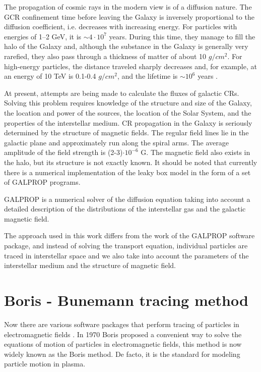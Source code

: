 \documentclass{article}
\begin{document}
The propagation of cosmic rays in the modern view is of a diffusion nature. The GCR confinement time before leaving the Galaxy is inversely proportional to the diffusion coefficient, i.e. decreases with increasing energy. For particles with energies of 1–2 GeV, it is $\sim 4 \cdot 10^7 $ years.
During this time, they manage to fill the halo of the Galaxy and, although the substance in the Galaxy is generally very rarefied, they also pass through a thickness of matter of about 10 $g/cm^2$. For high-energy particles, the distance traveled sharply decreases and, for example, at an energy of 10 TeV is 0.1-0.4 $g/cm^2$, and the lifetime is $\sim 10^6$ years \cite{Moskalenko, Moskalenko2}.

At present, attempts are being made to calculate the fluxes of galactic CRs. Solving this problem requires knowledge of the structure and size of the Galaxy, the location and power of the sources, the location of the Solar System, and the properties of the interstellar medium. CR propagation in the Galaxy is seriously determined by the structure of magnetic fields. The regular field lines lie in the galactic plane and approximately run along the spiral arms. The average amplitude of the field strength is (2-3)$\cdot 10^{-6}$ G. The magnetic field also exists in the halo, but its structure is not exactly known.
It should be noted that currently there is a numerical implementation of the leaky box model in the form of a set of GALPROP programs.


GALPROP is a numerical solver of the diffusion equation taking into account a detailed description of the distributions of the interstellar gas and the galactic magnetic field\cite{Moskalenko}.

The approach used in this work differs from the work of the GALPROP software package, and instead of solving the transport equation, individual particles are traced in interstellar space and we also take into account the parameters of the interstellar medium and the structure of magnetic field.

\section{Boris - Bunemann tracing method}
Now there are various software packages that perform tracing of particles in electromagnetic fields \cite{1}.
In 1970 Boris \cite{2} proposed a convenient way to solve the equations of motion of particles in electromagnetic fields, this method is now widely known as the Boris method. De facto, it is the standard for modeling particle motion in plasma.
\end{document}
